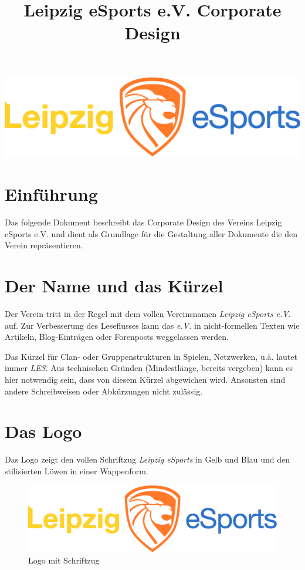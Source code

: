 \documentclass{article}
\begin{document}
\begin{titlepage}
\vspace*{\fill}
\title{Leipzig eSports e.V. Corporate Design}
\includegraphics[width=\textwidth]{Docs/Logo.eps}
{\let\newpage\relax\maketitle}
\vspace*{\fill}
\end{titlepage}

\cleardoublepage

\tableofcontents

\cleardoublepage
\section{Einführung}

Das folgende Dokument beschreibt das Corporate Design des Vereins Leipzig eSports e.V. und dient als Grundlage für die Gestaltung aller Dokumente die den Verein repräsentieren.

\section{Der Name und das Kürzel}

Der Verein tritt in der Regel mit dem vollen Vereinsnamen \emph{Leipzig eSports e.V.} auf. Zur Verbesserung des Leseflusses kann das \emph{e.V.} in nicht-formellen Texten wie Artikeln, Blog-Einträgen oder Forenposts weggelassen werden.

Das Kürzel für Clan- oder Gruppenstrukturen in Spielen, Netzwerken, u.ä. lautet immer \emph{LES}. Aus technischen Gründen (Mindestlänge, bereits vergeben) kann es hier notwendig sein, dass von diesem Kürzel abgewichen wird. Ansonsten sind andere Schreibweisen oder Abkürzungen nicht zulässig.

\section{Das Logo}

Das Logo zeigt den vollen Schriftzug \emph{Leipzig eSports} in Gelb und Blau und den stilisierten Löwen in einer Wappenform.
\begin{figure}[H]
\includegraphics[width=\textwidth]{Docs/Logo.eps}
\caption{Logo mit Schriftzug}
\end{figure}
\end{document}
